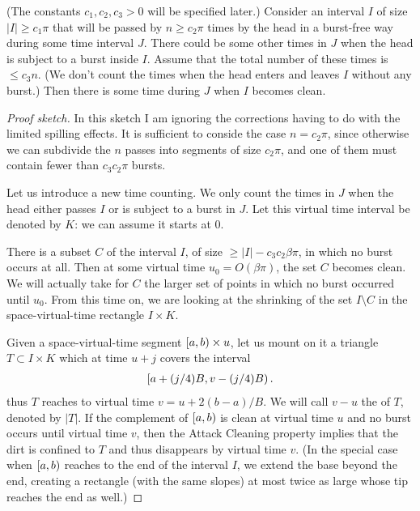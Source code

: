\documentclass[12pt]{memoir}
\renewcommand{\le}{\leq}
\renewcommand{\ge}{\geq}
\def\B{B}
\begin{document}
\begin{lemma}\label{lem:dirty-passes}
(The constants \( c_{1},c_{2},c_{3}>0 \) will be specified later.)
Consider an interval \( I \) of size \( |I|\ge c_{1}\pi \) 
that will be passed by \( n\ge c_{2}\pi \) times
by the head in a burst-free way during some time interval \( J \).
There could be some other times in \( J \) when the head is subject to a burst inside \( I \).
Assume that the total number of these times is \( \le c_{3} n \).
(We don't count the times when the head enters and leaves \( I \) without
any burst.)
Then there is some time during \( J \) when \( I \) becomes clean.
\end{lemma}
\begin{proof}[Proof sketch]
In this sketch I am ignoring the corrections having to do with the
limited spilling effects.
It is sufficient to conside the case \( n=c_{2}\pi \), since otherwise
we can subdivide the \( n \) passes into segments of size \( c_{2}\pi \),
and one of them must contain fewer than \( c_{3}c_{2}\pi \) bursts.

Let us introduce a new  time counting.
We only count the times in \( J \) when the head either passes \( I \)
or is subject to a burst in \( J \).
Let this virtual time interval be denoted by \( K \): we can assume it starts at 0.

There is a subset \( C \) of the interval \( I \),
of size \( \ge |I|-c_{3}c_{2}\beta\pi \), in which no burst occurs at all.
Then at some virtual time \( u_{0}=O(\beta\pi) \), the set \( C \) becomes clean.
We will actually take for \( C \) the larger set of points in which no burst occurred until
\( u_{0} \).
From this time on, we are looking at the shrinking of the set \( I\setminus C \)
in the space-virtual-time rectangle \( I\times K \).

Given a space-virtual-time segment \( \left[a,b\right)\times u \),
let us mount on it a triangle \( T\subset I\times K \)
which at time \( u+j \) covers the interval
 \begin{align*}
 \lint{a+(j/4)\B}{v-(j/4)\B}.
 \end{align*}
thus \( T \) reaches to virtual time \( v=u+2(b-a)/\B \).
We will call \( v-u \) the  of \( T \), denoted by \( |T| \).
If the complement of \( \left[a,b\right) \) is clean at virtual time \( u \)
and no burst occurs until virtual time 
\( v \), then the Attack Cleaning property implies that the dirt
is confined to \( T \) and thus disappears by virtual time \( v \).
(In the special case when \( \left[a,b\right) \) reaches to the end of the interval \( I \),
we extend the base beyond the end, creating a rectangle (with the same slopes)
at most twice as large whose tip reaches the end as well.)


\end{proof}
\end{document}
